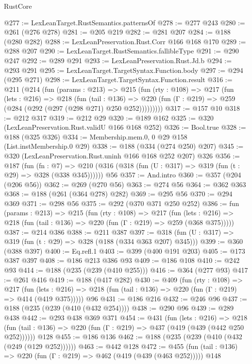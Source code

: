 \begin{lexlean}{RustCore}
\begin{coremodule}
@277 := LexLeanTarget.RustSemantics.patternsOf
@278 := @277 @243
@280 := @261 (@276 @278)
@281 := @205 @219
@282 := @281 @207
@284 := @188 (@280 @282)
@288 := LexLeanPreservation.Rust.Corr @166 @168 @170
@289 := @288 @207
@290 := LexLeanTarget.RustSemantics.fallibleType
@291 := @290 @247
@292 := @289 @291
@293 := LexLeanPreservation.Rust.Jd.b
@294 := @293 @291
@295 := LexLeanTarget.TargetSyntax.Function.body
@297 := @294 (@295 @271)
@298 := LexLeanTarget.TargetSyntax.Function.result
@316 := @211
    (@214
      (fun (params : @213) =>
      @215
        (fun (rty : @108) =>
        @217
          (fun (lets : @216) =>
          @218
            (fun (tail : @136) =>
            @220 (fun (Γ : @219) => @259 (@284 (@292 (@297 (@298 @271) @250 @252)))))))))
@317 := @157 @10
@318 := @212 @317
@319 := @212 @29
@320 := @189 @162
@325 := @320 (LexLeanPreservation.Rust.validU @166 @168 @252)
@326 := Bool.true
@328 := @188 (@325 @326)
@334 := Membership.mem.{0, 0} @29 @158 (List.instMembership.{0} @29)
@338 := @188 (@334 (@274 @250) @207)
@345 := @320 (LexLeanPreservation.Rust.uninh @166 @168 @252 @207) @326
@356 := @187
    (fun (fn : @7) =>
    @210 (@316 (@318 (fun (U : @317) => @319 (fun (t : @29) => @328 (@338 @345))))))
    @56
@357 := And.intro
@360 := @357 (@204 (@206 @56))
@362 := @269 (@270 @56)
@363 := @274 @56
@364 := @362 @363
@368 := @188 (@261 (@364 @278) @282)
@369 := @295 @56
@370 := @294 @369
@371 := @298 @56
@375 := @292 (@370 @371 @250 @252)
@386 := fun (params : @213) =>
  @215
    (fun (rty : @108) =>
    @217
      (fun (lets : @216) => @218 (fun (tail : @136) => @220 (fun (Γ : @219) => @259 (@368 @375)))))
@387 := @214 @386
@388 := @211 @387
@397 := @318 (fun (U : @317) => @319 (fun (t : @29) => @328 (@188 (@334 @363 @207) @345)))
@399 := @360 (@388 @397)
@400 := Eq.refl.{1}
@403 := @399 (@400 @191 @203)
@405 := @173 @387 @397
@408 := @186 @213 @386 @93
@409 := @186 @108
@410 := @242 @93
@414 := @188 (@235 (@239 (@410 @255)))
@416 := @364 (@277 @93)
@417 := @261 @416
@419 := @188 (@417 @282)
@430 := @409
    (fun (rty : @108) =>
    @217
      (fun (lets : @216) => @218 (fun (tail : @136) => @220 (fun (Γ : @219) => @414 (@419 @375)))))
    @96
@431 := @186 @216
@432 := @246 @96
@437 := @188 (@235 (@239 (@410 (@432 @254))))
@438 := @290 @96
@439 := @289 @438
@442 := @293 @438 @369 @371
@454 := @431
    (fun (lets : @216) =>
    @218 (fun (tail : @136) => @220 (fun (Γ : @219) => @437 (@419 (@439 (@442 @250 @252))))))
    @128
@455 := @186 @136
@462 := @188 (@235 (@239 (@410 (@432 (@249 (@129 @252))))))
@463 := @442 @128
@472 := @455 (fun (tail : @136) => @220 (fun (Γ : @219) => @462 (@419 (@439 (@463 @252))))) @148

\end{coremodule}
\end{lexlean}
